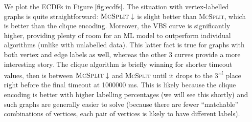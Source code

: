 \documentclass{l4proj}
\theoremstyle{definition}
\theoremstyle{remark}
\begin{document}
We plot the ECDFs in Figure \ref{fig:ecdfs}. The situation with vertex-labelled
graphs is quite straightforward: $\textsc{McSplit}\downarrow$ is slight better
than \textsc{McSplit}, which is better than the clique encoding. Moreover, the
VBS curve is significantly higher, providing plenty of room for an ML model to
outperform individual algorithms (unlike with unlabelled data). This latter fact
is true for graphs with both vertex and edge labels as well, whereas the other 3
curves provide a more interesting story. The clique algorithm is briefly winning
for shorter timeout values, then is between $\textsc{McSplit}\downarrow$ and
\textsc{McSplit} until it drops to the 3\textsuperscript{rd} place right before
the final timeout at \num{1000000} ms. This is likely because the clique
encoding is better with higher labelling percentages (we will see this shortly)
and such graphs are generally easier to solve (because there are fewer
``matchable'' combinations of vertices, each pair of vertices is likely to have
different labels).
\end{document}
